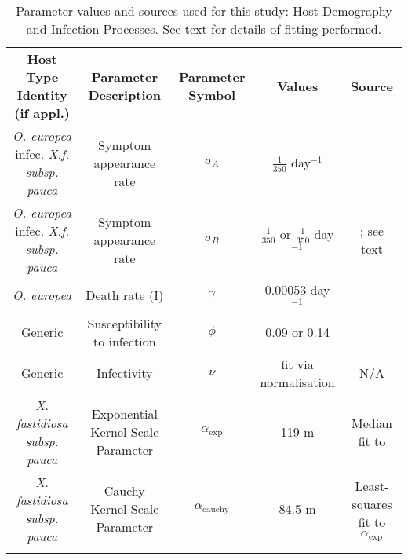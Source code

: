 \documentclass[11pt,letterpaper]{article}
\newlength\savedwidth
\newcommand\thickhline{\noalign{\global\savedwidth\arrayrulewidth\global\arrayrulewidth 2pt}%
\hline
\noalign{\global\arrayrulewidth\savedwidth}}
\begin{document}
\begin{table}
\centering
\begin{adjustbox}{width=\textwidth}
\small
    \begin{tabular}{|c|c|c|c|c|}
    \thickhline
         \textbf{Host Type Identity (if appl.)}  & \textbf{Parameter Description} & \textbf{Parameter Symbol} & \textbf{Values} & \textbf{Source}\\
         \thickhline
        \thickhline
         \emph{O. europea} infec. \emph{X.f. subsp. pauca} & Symptom appearance rate & $\sigma_{A}$& $\frac{1}{350}$ day$^{-1}$ &  \cite{Bragard2019}\\
         \thickhline
                  \emph{O. europea} infec. \emph{X.f. subsp. pauca} & Symptom appearance rate & $\sigma_{B}$& $\frac{1}{350}$ or $\frac{1}{350}$ day$^{-1}$ &  \cite{Bragard2019}; see text\\
        \thickhline
         \emph{O. europea} & Death rate (I) & $\gamma$  & 0.00053 day$^{-1}$&  \cite{Bragard2019} \\
        \thickhline
        Generic & Susceptibility to infection& $\phi$& 0.09 or 0.14 & \cite{HyattTwynam2017}\\
        \thickhline
        Generic & Infectivity & $\nu$ & fit via normalisation & N/A \\
        \thickhline
        \emph{X. fastidiosa subsp. pauca}& Exponential Kernel Scale Parameter & $\alpha_{\mathrm{exp}}$ & 119 m & Median fit to \cite{Bodino2021}\\
        \thickhline
        \emph{X. fastidiosa subsp. pauca}& Cauchy Kernel Scale Parameter & $\alpha_{\mathrm{cauchy}}$ & 84.5 m & Least-squares fit to $\alpha_{\mathrm{exp}}$ \\
        \thickhline
    \end{tabular}
    \end{adjustbox}
    \caption{Parameter values and sources used for this study: Host Demography and Infection Processes. See text for details of fitting performed.}
    \label{demography}
\end{table}
\end{document}
